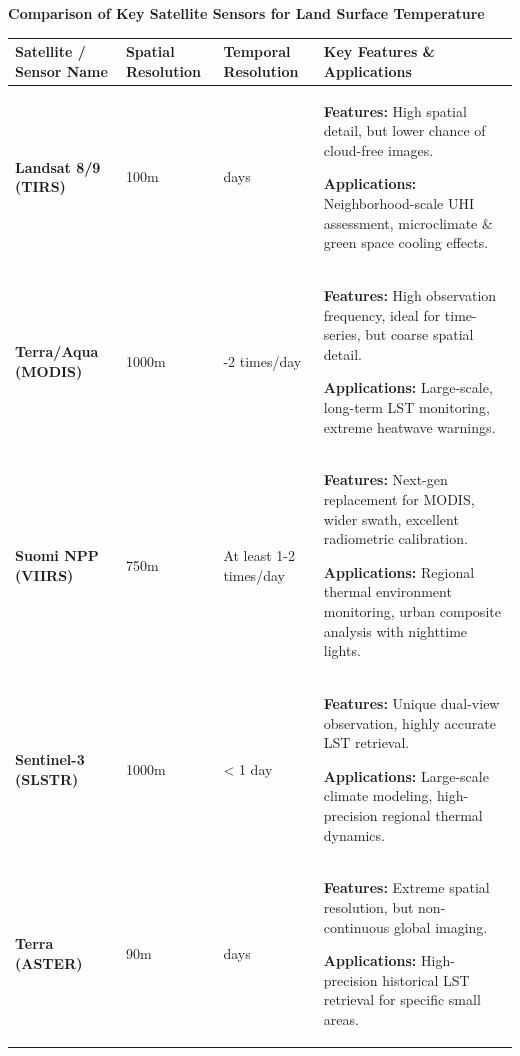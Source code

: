 \documentclass[
  letterpaper,
  DIV=11,
  numbers=noendperiod]{scrreprt}
\begin{document}
\textbf{Comparison of Key Satellite Sensors for Land Surface
Temperature}

\begin{longtable}[]{@{}
  >{\raggedright\arraybackslash}p{}
  >{\raggedright\arraybackslash}p{}
  >{\raggedright\arraybackslash}p{}
  >{\raggedright\arraybackslash}p{}@{}}
\toprule\noalign{}
\begin{minipage}[b]{\linewidth}\raggedright
Satellite / Sensor Name
\end{minipage} & \begin{minipage}[b]{\linewidth}\raggedright
Spatial Resolution
\end{minipage} & \begin{minipage}[b]{\linewidth}\raggedright
Temporal Resolution
\end{minipage} & \begin{minipage}[b]{\linewidth}\raggedright
Key Features \& Applications
\end{minipage} \\
\midrule\noalign{}
\endhead
\bottomrule\noalign{}
\endlastfoot
\textbf{Landsat 8/9 (TIRS)} & 100m & 16 days & \textbf{Features:} High
spatial detail, but lower chance of cloud-free images.

\textbf{Applications:} Neighborhood-scale UHI assessment, microclimate
\& green space cooling effects. \\
\textbf{Terra/Aqua (MODIS)} & 1000m & 1-2 times/day & \textbf{Features:}
High observation frequency, ideal for time-series, but coarse spatial
detail.

\textbf{Applications:} Large-scale, long-term LST monitoring, extreme
heatwave warnings. \\
\textbf{Suomi NPP (VIIRS)} & 750m & At least 1-2 times/day &
\textbf{Features:} Next-gen replacement for MODIS, wider swath,
excellent radiometric calibration.

\textbf{Applications:} Regional thermal environment monitoring, urban
composite analysis with nighttime lights. \\
\textbf{Sentinel-3 (SLSTR)} & 1000m & \textless{} 1 day &
\textbf{Features:} Unique dual-view observation, highly accurate LST
retrieval.

\textbf{Applications:} Large-scale climate modeling, high-precision
regional thermal dynamics. \\
\textbf{Terra (ASTER)} & 90m & 16 days & \textbf{Features:} Extreme
spatial resolution, but non-continuous global imaging.

\textbf{Applications:} High-precision historical LST retrieval for
specific small areas. \\
\end{longtable}
\end{document}
